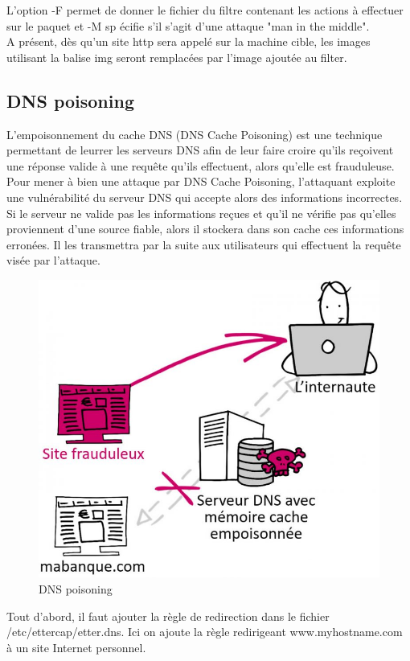 \documentclass[12pt, oneside]{article}
\begin{document}
L'option -F permet de donner le fichier du filtre contenant les actions à effectuer sur le paquet et -M sp écifie s’il s’agit d’une attaque "man in the middle".\\
A présent, dès qu'un site http sera appelé sur la machine cible, les images utilisant la balise img seront remplacées par l'image ajoutée au filter.

\subsection{DNS poisoning}
L’empoisonnement du cache DNS (DNS Cache Poisoning) est une technique permettant de leurrer les serveurs DNS afin de leur faire croire qu’ils reçoivent une réponse valide à une requête qu’ils effectuent, alors qu’elle est frauduleuse.
Pour mener à bien une attaque par DNS Cache Poisoning, l’attaquant exploite une vulnérabilité du serveur DNS qui accepte alors des informations incorrectes. Si le serveur ne valide pas les informations reçues et qu’il ne vérifie pas qu’elles proviennent d’une source fiable, alors il stockera dans son cache ces informations erronées.  Il les transmettra par la suite aux utilisateurs qui effectuent la requête visée par l’attaque.
\begin{figure}[H]
\centering
\includegraphics[scale=0.4]{dns-poisoning}
\caption{DNS poisoning}
\end{figure}
Tout d'abord, il faut ajouter la règle de redirection dans le fichier /etc/ettercap/etter.dns. Ici on ajoute la règle redirigeant www.myhostname.com à un site Internet personnel.
\end{document}
